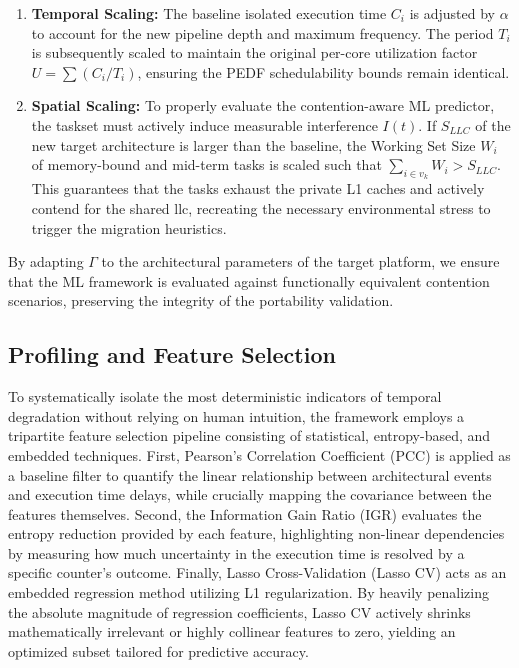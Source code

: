 \documentclass[conference]{IEEEtran}
\begin{document}
\begin{enumerate}
    \item \textbf{Temporal Scaling:} The baseline isolated execution time $C_i$ is adjusted by $\alpha$ to account for the new pipeline depth and maximum frequency. The period $T_i$ is subsequently scaled to maintain the original per-core utilization factor $U = \sum (C_i / T_i)$, ensuring the PEDF schedulability bounds remain identical.
    \item \textbf{Spatial Scaling:} To properly evaluate the contention-aware ML predictor, the taskset must actively induce measurable interference $I(t)$. If $S_{LLC}$ of the new target architecture is larger than the baseline, the Working Set Size $W_i$ of memory-bound and mid-term tasks is scaled such that $\sum_{i \in v_k} W_i > S_{LLC}$. This guarantees that the tasks exhaust the private L1 caches and actively contend for the shared \gls{llc}, recreating the necessary environmental stress to trigger the migration heuristics.
\end{enumerate}

By adapting $\Gamma$ to the architectural parameters of the target platform, we ensure that the ML framework is evaluated against functionally equivalent contention scenarios, preserving the integrity of the portability validation.

\subsection{Profiling and Feature Selection}\label{sec:feature_selection}
To systematically isolate the most deterministic indicators of temporal degradation without relying on human intuition, the framework employs a tripartite feature selection pipeline consisting of statistical, entropy-based, and embedded techniques. First, Pearson's Correlation Coefficient (PCC) is applied as a baseline filter to quantify the linear relationship between architectural events and execution time delays, while crucially mapping the covariance between the features themselves. Second, the Information Gain Ratio (IGR) evaluates the entropy reduction provided by each feature, highlighting non-linear dependencies by measuring how much uncertainty in the execution time is resolved by a specific counter's outcome. Finally, Lasso Cross-Validation (Lasso CV) acts as an embedded regression method utilizing L1 regularization. By heavily penalizing the absolute magnitude of regression coefficients, Lasso CV actively shrinks mathematically irrelevant or highly collinear features to zero, yielding an optimized subset tailored for predictive accuracy.
\end{document}

